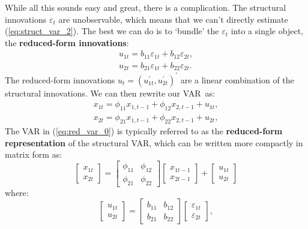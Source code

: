 \documentclass[10pt]{article}
\begin{document}
While all this sounds easy and great, there is a complication. The
structural innovations $\varepsilon _{t}$ are unobservable, which means that
we can't directly estimate (\ref{eq:struct_var_2}). The best we can do is to
`bundle' the $\varepsilon _{t}$ into a single object, the \textbf{%
reduced-form innovations}:%
\begin{equation}
\begin{array}{c}
u_{1t}=b_{11}\varepsilon _{1t}+b_{12}\varepsilon _{2t}, \\ 
u_{2t}=b_{21}\varepsilon _{1t}+b_{22}\varepsilon _{2t}.%
\end{array}
\label{eq:red_resid_1}
\end{equation}%
The reduced-form innovations $u_{t}=\left( u_{1t}^{\prime },u_{2t}^{\prime
}\right) ^{\prime }$ are a linear combination of the structural innovations.
We can then rewrite our VAR\ as:%
\begin{equation}
\begin{array}{c}
x_{1t}=\phi _{11}x_{1,t-1}+\phi _{12}x_{2,t-1}+u_{1t}, \\ 
x_{2t}=\phi _{21}x_{1,t-1}+\phi _{22}x_{2,t-1}+u_{2t},%
\end{array}
\label{eq:red_var_0}
\end{equation}%
The VAR in (\ref{eq:red_var_0}) is typically referred to as the \textbf{%
reduced-form representation} of the structural VAR, which can be written
more compactly in matrix form as:%
\begin{equation}
\left[ 
\begin{array}{c}
x_{1t} \\ 
x_{2t}%
\end{array}%
\right] =%
\begin{bmatrix}
\phi _{11} & \phi _{12} \\ 
\phi _{21} & \phi _{22}%
\end{bmatrix}%
\left[ 
\begin{array}{c}
x_{1t-1} \\ 
x_{2t-1}%
\end{array}%
\right] +\left[ 
\begin{array}{c}
u_{1t} \\ 
u_{2t}%
\end{array}%
\right]  \label{eq:red_var_1}
\end{equation}%
where:%
\begin{equation}
\left[ 
\begin{array}{c}
u_{1t} \\ 
u_{2t}%
\end{array}%
\right] =%
\begin{bmatrix}
b_{11} & b_{12} \\ 
b_{21} & b_{22}%
\end{bmatrix}%
\begin{bmatrix}
\varepsilon _{1t} \\ 
\varepsilon _{2t}%
\end{bmatrix}%
,  \label{eq:red_resid_2}
\end{equation}%
\end{document}
